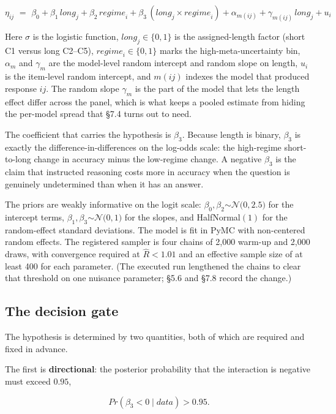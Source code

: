 \documentclass{article}
\begin{document}
\[\eta_{ij}\mspace{6mu} = \mspace{6mu}\beta_{0} + \beta_{1}\,{long}_{j} + \beta_{2}\,{regime}_{i} + \beta_{3}\,({long}_{j} \times {regime}_{i}) + \alpha_{m(ij)} + \gamma_{m(ij)}\,{long}_{j} + u_{i}\]

Here \(\sigma\) is the logistic function, \({long}_{j} \in \{ 0,1\}\) is
the assigned-length factor (short C1 versus long C2--C5),
\({regime}_{i} \in \{ 0,1\}\) marks the high-meta-uncertainty bin,
\(\alpha_{m}\) and \(\gamma_{m}\) are the model-level random intercept
and random slope on length, \(u_{i}\) is the item-level random
intercept, and \(m(ij)\) indexes the model that produced response
\(ij\). The random slope \(\gamma_{m}\) is the part of the model that
lets the length effect differ across the panel, which is what keeps a
pooled estimate from hiding the per-model spread that \S{}7.4 turns out to
need.

The coefficient that carries the hypothesis is \(\beta_{3}\). Because
length is binary, \(\beta_{3}\) is exactly the difference-in-differences
on the log-odds scale: the high-regime short-to-long change in accuracy
minus the low-regime change. A negative \(\beta_{3}\) is the claim that
instructed reasoning costs more in accuracy when the question is
genuinely undetermined than when it has an answer.

The priors are weakly informative on the logit scale:
\(\beta_{0},\beta_{2}\mathcal{\sim N(}0,2.5)\) for the intercept terms,
\(\beta_{1},\beta_{3}\mathcal{\sim N(}0,1)\) for the slopes, and
HalfNormal\((1)\) for the random-effect standard deviations. The model
is fit in PyMC with non-centered random effects. The registered sampler
is four chains of 2,000 warm-up and 2,000 draws, with convergence
required at \(\widehat{R} < 1.01\) and an effective sample size of at
least 400 for each parameter. (The executed run lengthened the chains to
clear that threshold on one nuisance parameter; \S{}5.6 and \S{}7.8 record the
change.)

\subsection{The decision gate}\label{the-decision-gate}

The hypothesis is determined by two quantities, both of which are
required and fixed in advance.

The first is \textbf{directional}: the posterior probability that the
interaction is negative must exceed \(0.95\),

\[Pr(\beta_{3} < 0 \mid data) > 0.95.\]
\end{document}
